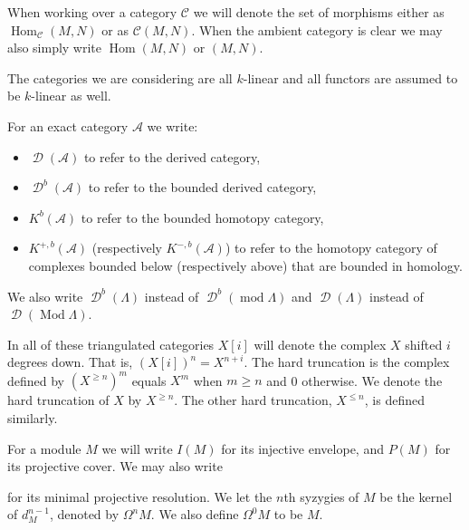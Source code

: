 \documentclass[11pt, a4paper, english]{article}
\theoremstyle{definition}
\DeclareMathOperator{\Hom}{Hom}
\DeclareMathOperator{\Mod}{Mod}
\def\mod{\operatorname{mod}}
\DeclareMathOperator{\D}{\mathscr{D}}
\begin{document}


When working over a category $\mathcal C$ we will denote the set of morphisms either as $\Hom_{\mathcal C}(M, N)$ or as $\mathcal C(M,N)$. When the ambient category is clear we may also simply write $\Hom(M, N)$ or $(M, N)$.

The categories we are considering are all $k$-linear and all functors are assumed to be $k$-linear as well.


For an exact category $\mathcal A$ we write:
\begin{itemize}
	\item $\D(\mathcal A)$ to refer to the derived category, 
	\item $\D^b(\mathcal A)$ to refer to the bounded derived category, 
	\item $K^b(\mathcal A)$ to refer to the bounded homotopy category, 
	\item $K^{+,b}(\mathcal A)$ (respectively $K^{-,b}(\mathcal A)$) to refer to the homotopy category of complexes bounded below (respectively above) that are bounded in homology.
\end{itemize}
We also write $\D^b(\Lambda)$ instead of $\D^b(\mod\Lambda)$ and $\D(\Lambda)$ instead of $\D(\Mod\Lambda)$. 

In all of these triangulated categories $X[i]$ will denote the complex $X$ shifted $i$ degrees down. That is, $(X[i])^n = X^{n+i}$. The hard truncation is the complex defined by $(X^{\geq n})^m$ equals $X^m$ when $m \geq n$ and 0 otherwise. We denote the hard truncation of $X$ by $X^{\geq n}$. The other hard truncation, $X^{\leq n}$, is defined similarly.


For a module $M$ we will write $I(M)$ for its injective envelope, and $P(M)$ for its projective cover. We may also write 
\begin{center}
\end{center} 
for its minimal projective resolution. We let the $n$th syzygies of $M$ be the kernel of $d_M^{n-1}$, denoted by $\Omega^n M$. We also define $\Omega^0 M$ to be $M$.
\end{document}
